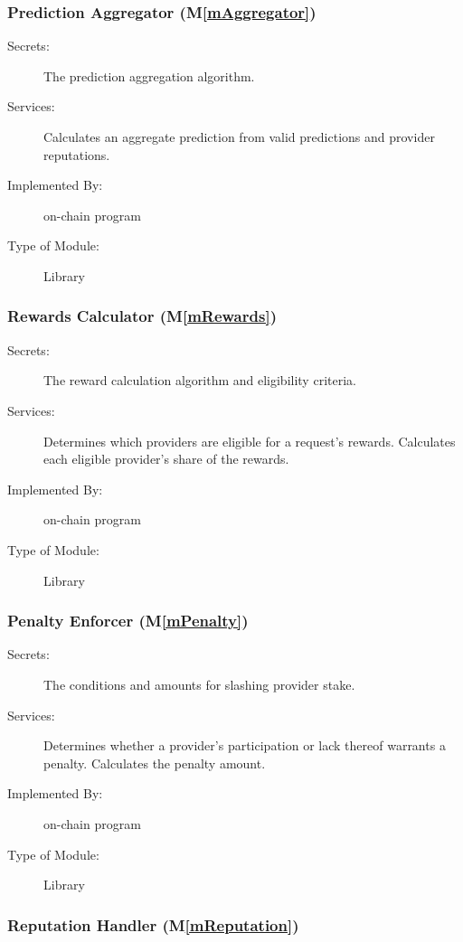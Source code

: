 \documentclass[12pt, titlepage]{article}
\newcommand{\mref}[1]{M\ref{#1}}
\begin{document}
\subsubsection{Prediction Aggregator (\mref{mAggregator})}

\begin{description}
\item[Secrets:] The prediction aggregation algorithm.
\item[Services:] Calculates an aggregate prediction from valid predictions
  and provider reputations.
\item[Implemented By:] \progname{} on-chain program
\item[Type of Module:] Library
\end{description}

\subsubsection{Rewards Calculator (\mref{mRewards})}

\begin{description}
\item[Secrets:] The reward calculation algorithm and eligibility criteria.
\item[Services:] Determines which providers are eligible for a request's
  rewards. Calculates each eligible provider's share of the rewards.
\item[Implemented By:] \progname{} on-chain program
\item[Type of Module:] Library
\end{description}

\subsubsection{Penalty Enforcer (\mref{mPenalty})}

\begin{description}
\item[Secrets:] The conditions and amounts for slashing provider stake.
\item[Services:] Determines whether a provider's participation or lack thereof warrants a penalty.
  Calculates the penalty amount.
\item[Implemented By:] \progname{} on-chain program
\item[Type of Module:] Library
\end{description}

\subsubsection{Reputation Handler (\mref{mReputation})}
\end{document}
